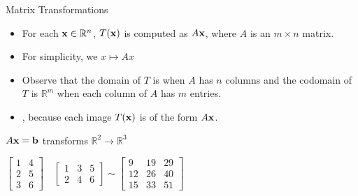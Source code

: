 \begin{frame}{Matrix Transformations}
\begin{itemize}
  \item For each $\mathbf{x}\in\mathbb{R}^n$, $T(\mathbf{x})$ is computed as $A\mathbf{x}$, where $A$ is an $m\times n$ matrix. \pause
  \item For simplicity, we {}  $x \mapsto Ax$\pause
  \item Observe that the domain of $T$ is {} when $A$ has $n$ columns and the codomain of $T$ is $\mathbb{R}^m$ when each column of $A$ has $m$ entries.\pause
  \item {\color{red}{The range of $T$ is the set of all linear combinations of the columns of $A$}}, because each image $T(\mathbf{x})$ is of the form $A\mathbf{x}$.
\end{itemize}
\begin{center}

$A \mathbf{x} = \mathbf{b}$ transforms $\mathbb{R}^2 \rightarrow \mathbb{R}^3$

$\begin{bmatrix}1&4\\2&5\\3&6\end{bmatrix}\quad\begin{bmatrix}1&3&5\\2&4&6\end{bmatrix} \sim \begin{bmatrix}9&19&29\\12&26&40\\15&33&51\end{bmatrix}$

\end{center}
\end{frame}

